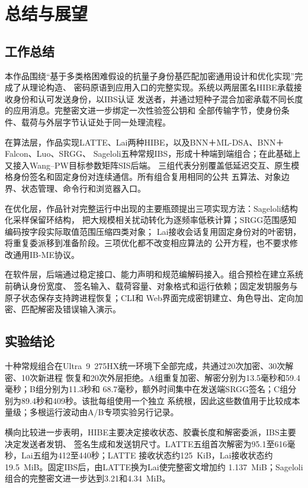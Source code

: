 \chapter{总结与展望}

\section{工作总结}

本作品围绕“基于多类格困难假设的抗量子身份基匹配加密通用设计和优化实现”完成了从理论构造、
密码原语到应用入口的完整实现。系统以两层匿名HIBE承载接收身份和认可发送身份，以IBS认证
发送者，并通过短种子混合加密承载不同长度的应用消息。完整密文进一步绑定一次性验签公钥和
全部传输字节，使身份条件、载荷与外层字节认证处于同一处理流程。

在算法层，作品实现LATTE、Lai两种HIBE，以及BNN＋ML-DSA、BNN＋Falcon、Luo、SRGG、
Sageloli五种常规IBS，形成十种端到端组合；在此基础上又接入Wang--PW目标参数矩阵SIS后端。
三组代表分别覆盖低延迟交互、原生模格身份签名和固定身份对连续通信。所有组合复用相同的公共
五算法、对象边界、状态管理、命令行和浏览器入口。

在优化层，作品针对完整运行中出现的主要瓶颈提出三项实现方法：Sageloli结构化采样保留环结构，
把大规模相关扰动转化为逐频率低秩计算；SRGG范围感知编码按字段实际取值范围压缩四类对象；
Lai接收会话复用固定身份对的叶密钥，将重复委派移到准备阶段。三项优化都不改变相应算法的
公开方程，也不要求修改通用IB-ME协议。

在软件层，后端通过稳定接口、能力声明和规范编解码接入。组合预检在建立系统前确认身份宽度、
签名输入、载荷容量、对象格式和运行依赖；固定发钥服务与原子状态保存支持跨进程恢复；CLI和
Web界面完成密钥建立、角色导出、定向加密、匹配解密及错误输入演示。

\section{实验结论}

十种常规组合在Ultra~9~275HX统一环境下全部完成，共通过20次加密、30次解密、10次新进程
恢复和20次外层拒绝。A组重复加密、解密分别为13.5毫秒和59.4毫秒；B组分别为11.3秒和
68.7毫秒，额外时间集中在发送端SRGG签名；C组分别为89.4秒和409秒。该批每组使用一个独立
系统根，因此这些数值用于比较成本量级；多根运行波动由A/B专项实验另行记录。

横向比较进一步表明，HIBE主要决定接收状态、胶囊长度和解密委派，IBS主要决定发送者发钥、
签名生成和发送钥尺寸。LATTE五组首次解密为95.1至616毫秒，Lai五组为412至440秒；LATTE
接收状态约125~KiB，Lai接收状态约19.5~MiB。固定IBS后，由LATTE换为Lai使完整密文增加约
1.137~MiB；Sageloli组合的完整密文进一步达到3.21和4.34~MiB。

